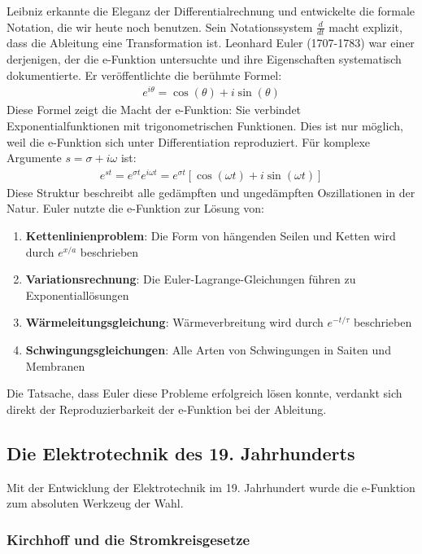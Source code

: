 \documentclass[a4paper, 12pt, twoside, openright]{report}
\theoremstyle{definition}
\theoremstyle{definition}
\begin{document}
Leibniz erkannte die Eleganz der Differentialrechnung und entwickelte die formale Notation, die wir heute noch benutzen. Sein Notationssystem $\frac{d}{dt}$ macht explizit, dass die Ableitung eine Transformation ist. Leonhard Euler (1707-1783) war einer derjenigen, der die e-Funktion untersuchte und ihre Eigenschaften systematisch dokumentierte. Er veröffentlichte die berühmte Formel:
\begin{align}
	e^{i\theta} = \cos(\theta) + i \sin(\theta)
\end{align}
Diese Formel zeigt die Macht der e-Funktion: Sie verbindet Exponentialfunktionen mit trigonometrischen Funktionen. Dies ist nur möglich, weil die e-Funktion sich unter Differentiation reproduziert. Für komplexe Argumente $s = \sigma + i\omega$ ist:
\begin{align}
	e^{st} = e^{\sigma t} e^{i\omega t} = e^{\sigma t}[\cos(\omega t) + i\sin(\omega t)]
\end{align}
Diese Struktur beschreibt alle gedämpften und ungedämpften Oszillationen in der Natur. Euler nutzte die e-Funktion zur Lösung von:
\begin{enumerate}
	\item \textbf{Kettenlinienproblem}: Die Form von hängenden Seilen und Ketten wird durch $e^{x/a}$ beschrieben
	\item \textbf{Variationsrechnung}: Die Euler-Lagrange-Gleichungen führen zu Exponentiallösungen
	\item \textbf{Wärmeleitungsgleichung}: Wärmeverbreitung wird durch $e^{-t/\tau}$ beschrieben
	\item \textbf{Schwingungsgleichungen}: Alle Arten von Schwingungen in Saiten und Membranen
\end{enumerate}

Die Tatsache, dass Euler diese Probleme erfolgreich lösen konnte, verdankt sich direkt der Reproduzierbarkeit der e-Funktion bei der Ableitung.

\subsection{Die Elektrotechnik des 19. Jahrhunderts}

Mit der Entwicklung der Elektrotechnik im 19. Jahrhundert wurde die e-Funktion zum absoluten Werkzeug der Wahl.

\subsubsection*{Kirchhoff und die Stromkreisgesetze}
\end{document}
